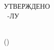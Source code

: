 
\ifNSLHaveESKDFrame
\makeatletter
\def\@oddhead{\titleFrame}
\def\@oddfoot{}
\makeatother
\fi

\hfill  
\vspace{30mm}

\ifNSLHaveLY
\parbox[t]{.45\linewidth}{
   УТВЕРЖДЕНО\\
   \decim\ \docType-ЛУ
   
}
\fi

\hfill 
\vspace{35mm}

\begin{centering}
	\MakeUppercase{\devNameFull} \\
	(\devName) \\
	{\bfseries {\docTypeFull} \\
		\decim\ \docType} \\
\end{centering}

\ifNSLHaveESKDFrame
\clearpage
\makeatletter
\def\@oddhead{}
\def\@oddfoot{}
\makeatother
\fi

